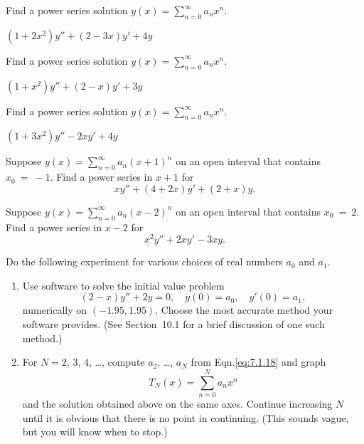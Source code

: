 \documentclass{ximera}
\begin{document}
\begin{problem}\label{exer:7.1.13} 
Find a power series solution $y(x)=\sum_{n=0}^\infty a_nx^n$.

$(1+2x^2)y''+(2-3x)y'+4y$
\end{problem}

\begin{problem}\label{exer:7.1.14}
Find a power series solution $y(x)=\sum_{n=0}^\infty a_nx^n$.

$(1+x^2)y''+(2-x)y'+3y$
\end{problem}

\begin{problem}\label{exer:7.1.15}
Find a power series solution $y(x)=\sum_{n=0}^\infty a_nx^n$.

$(1+3x^2)y''-2xy'+4y$
\end{problem}

\begin{problem}\label{exer:7.1.16} Suppose $y(x)=\sum_{n=0}^\infty a_n(x+1)^n$
on an open interval that contains $x_0~=~-1$. Find a power series in
$x+1$ for
$$
xy''+(4+2x)y'+(2+x)y.
$$
\end{problem}

\begin{problem}\label{exer:7.1.17}  Suppose $y(x)=\sum_{n=0}^\infty
a_n(x-2)^n$ on an open interval  that contains $x_0~=~2$.
Find a power series in $x-2$ for
$$
x^2y''+2xy'-3xy.
$$
\end{problem}

\begin{problem}\label{exer:7.1.18}   
Do the following experiment for various choices of
real numbers  $a_0$ and $a_1$.
\begin{enumerate}
\item %
Use software  to solve the initial value problem
$$
(2-x)y''+2y=0,\quad y(0)=a_0,\quad y'(0)=a_1,
$$
numerically on $(-1.95,1.95)$. Choose the most accurate method
your software provides.
(See Section~10.1 for a brief discussion of one such
method.)
\item %
For $N=2$, $3$, $4$, \dots, compute $a_2$, \dots, $a_N$
from Eqn.\eqref{eq:7.1.18} and graph
$$
T_N(x)=\sum_{n=0}^N a_nx^n
$$
and the solution obtained above on the same axes.
Continue increasing $N$ until it is obvious that there is
no point in continuing.
(This sounds vague, but you will know when to stop.)
\end{enumerate}
\end{problem}
\end{document}
